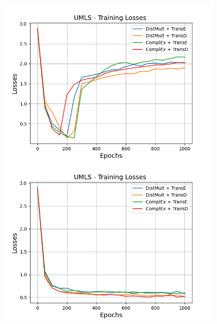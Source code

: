 \begin{figure}
    \centering
    \begin{minipage}{.5\textwidth}
      \centering
      \includegraphics[width=0.9\linewidth]{figures/results/gan_train/not_pretrained/uncertainty/max/entropy/umls/uncertainty_umls_losses.png}
    \end{minipage}%
    \begin{minipage}{.5\textwidth}
      \centering
      \includegraphics[width=0.9\linewidth]{figures/results/gan_train/not_pretrained/uncertainty/max_distribution/entropy/umls/uncertainty_umls_losses.png}
    \end{minipage}
    \begin{minipage}{.5\textwidth}
      \centering

\end{minipage}
\end{figure}
